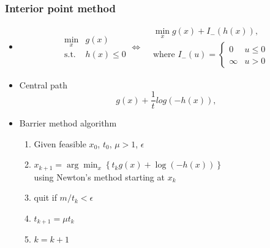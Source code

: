\documentclass{beamer}
\begin{document}
\begin{frame}
\frametitle{Interior point method}
\begin{itemize}
\item
\begin{equation}
    \begin{aligned}
             \min_{x} &g(x)\\
             \text{s.t. } &h(x)\leq 0
    \end{aligned}
    \iff
    \begin{aligned}
         &\min_{x} g(x) + I_{-}(h(x)),\\
         &\text{where } I_{-}(u)= \begin{cases}0 & u \leq 0 \\ \infty & u>0\end{cases}
    \end{aligned}
\end{equation}
\item Central path
\begin{equation}\label{logbarrier}
    g(x) + \frac{1}{t}log(-h(x)),
\end{equation}
\item Barrier method algorithm\cite{p3}
\begin{enumerate}
    \item Given feasible $x_0$, $t_0$, $\mu>1$, $\epsilon$
    \item
    $x_{k+1} = \arg\min_{x}\left\{t_kg(x)+\log(-h(x))\right\}$\\
    using Newton's method starting at $x_{k}$
    \item quit if $m/t_k<\epsilon$
    \item $t_{k+1}=\mu t_k$
    \item $k = k+1$
\end{enumerate}
\end{itemize}
\end{frame}
\end{document}
